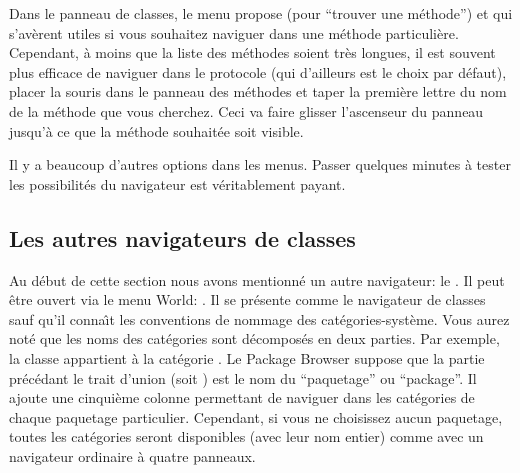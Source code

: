 \documentclass[a4paper,10pt,twoside]{book}
\begin{document}
Dans le panneau de classes, le menu propose  (pour ``trouver
une m\'ethode'') et
 qui s'av\`erent utiles si vous souhaitez
naviguer dans une m\'ethode particuli\`ere. Cependant, 
\`a moins que la liste des m\'ethodes soient tr\`es longues, il est souvent
plus efficace de naviguer dans le protocole  
(qui d'ailleurs est le choix par d\'efaut), placer la souris dans le
panneau des m\'ethodes et taper la premi\`ere lettre du nom de la m\'ethode
que vous cherchez.
Ceci va faire glisser l'ascenseur du panneau jusqu'\`a ce que la m\'ethode souhait\'ee soit visible.


Il y a beaucoup d'autres options dans les menus.  Passer quelques
minutes \`a tester les possibilit\'es du navigateur est v\'eritablement payant.  


\subsection{Les autres navigateurs de classes}
\label{sec:otherBrowsers}

Au d\'ebut de cette section nous avons mentionn\'e un autre navigateur:
le . 
Il peut \^etre ouvert via le menu World: .
Il se pr\'esente comme le navigateur de classes sauf qu'il conna\^{\i}t
les conventions de nommage des cat\'egories-syst\`eme.
Vous aurez not\'e que les noms des cat\'egories sont d\'ecompos\'es en deux
parties.
Par exemple, la classe  appartient \`a la cat\'egorie
.
\label{sec:package-names}
Le Package Browser suppose que la partie pr\'ec\'edant le trait d'union
(soit ) est le nom du ``paquetage'' ou ``package''. 
Il ajoute une cinqui\`eme
colonne permettant de naviguer dans les cat\'egories de chaque paquetage particulier. Cependant, si vous ne choisissez aucun paquetage, toutes les cat\'egories
seront disponibles 
(avec leur nom entier)
comme avec un navigateur ordinaire \`a quatre panneaux.
\end{document}
